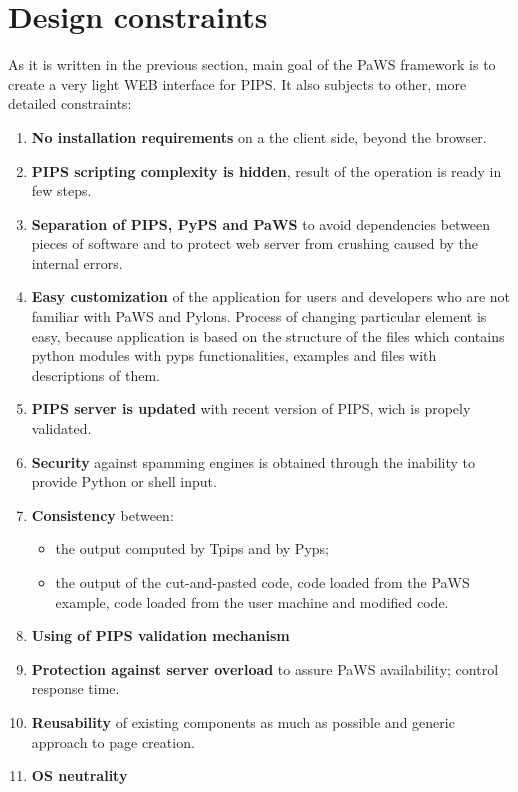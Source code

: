 \section{Design constraints}
\label{design_contraints}

As it is written in the previous section, main goal of the PaWS framework is to create a very light WEB interface for PIPS. It also subjects to other, more detailed constraints:

\begin{enumerate}
  \item {\bf No installation requirements} on a the client side, beyond the browser.
  \item {\bf PIPS scripting complexity is hidden}, result of the operation is ready in few steps.
  \item {\bf Separation of PIPS, PyPS and PaWS} to avoid dependencies between pieces of software and to protect web server from crushing caused by the internal errors.
  \item {\bf Easy customization} of the application for users and developers who are not familiar with PaWS and Pylons. Process of changing particular element is easy, because application is based on the structure of the files which contains python modules with pyps functionalities, examples and files with descriptions of them.
  \item {\bf PIPS server is updated} with recent version of PIPS, wich is propely validated.
  \item {\bf Security} against spamming engines is obtained through the inability to provide Python or shell input.
  \item {\bf Consistency} between:
    \begin{itemize}
      \item the output computed by Tpips and by Pyps;
      \item the output of the cut-and-pasted code, code loaded from the PaWS example, code loaded from the user machine and modified code.
    \end{itemize}
  \item {\bf Using of PIPS validation mechanism}
  \item {\bf Protection against server overload} to assure PaWS availability; control response time.
  \item {\bf Reusability} of existing components as much as possible and generic approach to page creation.
  \item {\bf OS neutrality}
\end{enumerate}

